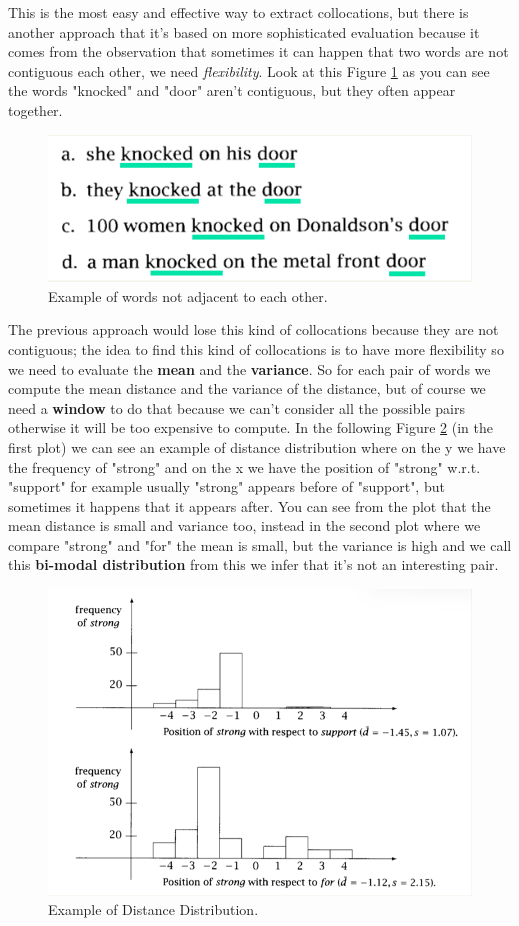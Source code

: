 This is the most easy and effective way to extract collocations, but there is another approach that it's based on more sophisticated evaluation because it comes from the observation that sometimes it can happen that two words are not contiguous each other, we need \textit{flexibility}. Look at this Figure \ref{fig:flexibilityapproach} as you can see the words "knocked" and "door" aren't contiguous, but they often appear together.\newline
\begin{figure}
    \centering
    \includegraphics[width=0.75\linewidth]{images/flexibilityapproach.png}
    \caption{Example of words not adjacent to each other.}
    \label{fig:flexibilityapproach}
\end{figure}
The previous approach would lose this kind of collocations because they are not contiguous; the idea to find this kind of collocations is to have more flexibility so we need to evaluate the \textbf{mean} and the \textbf{variance}. So for each pair of words we compute the mean distance and the variance of the distance, but of course we need a \textbf{window} to do that because we can't consider all the possible pairs otherwise it will be too expensive to compute.\newline
In the following Figure \ref{fig:distancedistribution} (in the first plot) we can see an example of distance distribution where on the y we have the frequency of "strong" and on the x we have the position of "strong" w.r.t. "support" for example usually "strong" appears before of "support", but sometimes it happens that it appears after. You can see from the plot that the mean distance is small and variance too, instead in the second plot where we compare "strong" and "for" the mean is small, but the variance is high and we call this \textbf{bi-modal distribution} from this we infer that it's not an interesting pair.
\begin{figure}
    \centering
    \includegraphics[width=0.75\linewidth]{images/exampledistancedistribution.png}
    \caption{Example of Distance Distribution.}
    \label{fig:distancedistribution}
\end{figure}
